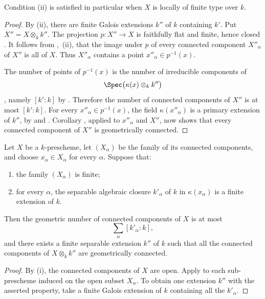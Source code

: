 Condition (ii) is satisfied in particular when $X$ is locally of
finite type over $k$.

\begin{proof}
By (ii), there are finite Galois extensions $k''$ of $k$ containing
$k'$.
Put $X''=X\otimes_k k''$.
The projection $p:X''\to X$ is faithfully flat and finite, hence
closed .
It follows from ,~(ii), that the image under $p$ of
every connected component $X''_\alpha$ of $X''$ is all of $X$.
Thus $X''_\alpha$ contains a point
$x''_\alpha\in p^{-1}(x)$.

The number of points of $p^{-1}(x)$ is the number of irreducible
components of
\[
\Spec\bigl(\kappa(x)\otimes_k k''\bigr)
\]
, namely $[k':k]$ by .
Therefore the number of connected components of $X''$ is at most
$[k':k]$.
For every $x''_\alpha\in p^{-1}(x)$, the field
$\kappa(x''_\alpha)$ is a primary extension of $k''$, by
 and .
Corollary , applied to $x''_\alpha$ and $X''$, now
shows that every connected component of $X''$ is geometrically
connected.
\end{proof}

\begin{corollary}[4.5.16]
\label{IV.4.5.16}
Let $X$ be a $k$-prescheme, let $(X_\alpha)$ be the family of its
connected components, and choose $x_\alpha\in X_\alpha$ for every
$\alpha$.
Suppose that:
\begin{enumerate}
\item[\rm(i)]
\label{IV.4.5.16.i}
the family $(X_\alpha)$ is finite;

\item[\rm(ii)]
\label{IV.4.5.16.ii}
for every $\alpha$, the separable algebraic closure $k'_\alpha$ of
$k$ in $\kappa(x_\alpha)$ is a finite extension of $k$.
\end{enumerate}
Then the geometric number of connected components of $X$ is at most
\[
\sum_\alpha[k'_\alpha:k],
\]
and there exists a finite separable extension $k''$ of $k$ such that
all the connected components of $X\otimes_k k''$ are geometrically
connected.
\end{corollary}

\begin{proof}
By (i), the connected components of $X$ are open.
Apply  to each sub-prescheme induced on the open
subset $X_\alpha$.
To obtain one extension $k''$ with the asserted property, take a
finite Galois extension of $k$ containing all the $k'_\alpha$.
\end{proof}

